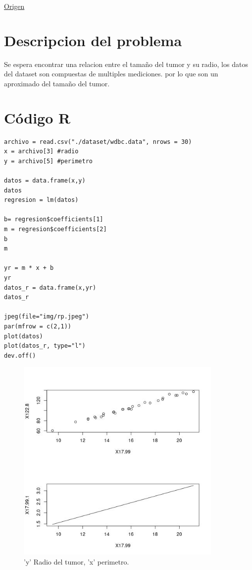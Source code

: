 \documentclass[12pt]{article}
\begin{document}
\href{https://archive-beta.ics.uci.edu/ml/datasets/breast+cancer+wisconsin+diagnostic}{Origen}

\section*{Descripcion del problema}
\label{sec:org0f13e39}
Se espera encontrar una relacion entre el tamaño del tumor y su radio, los datos del dataset son compuestas de multiples mediciones. por lo que son un aproximado del tamaño del tumor.

\section*{Código R}
\label{sec:org07511ed}
\begin{verbatim}
archivo = read.csv("./dataset/wdbc.data", nrows = 30)
x = archivo[3] #radio
y = archivo[5] #perimetro

datos = data.frame(x,y)
datos
regresion = lm(datos)

b= regresion$coefficients[1]
m = regresion$coefficients[2]
b
m

yr = m * x + b
yr
datos_r = data.frame(x,yr)
datos_r

jpeg(file="img/rp.jpeg")
par(mfrow = c(2,1))
plot(datos)
plot(datos_r, type="l")
dev.off()

\end{verbatim}

\begin{figure}[htbp]
\centering
\includegraphics[width=10cm]{img/rp.jpeg}
\caption{'y' Radio del tumor, 'x' perimetro.}
\end{figure}
\end{document}
